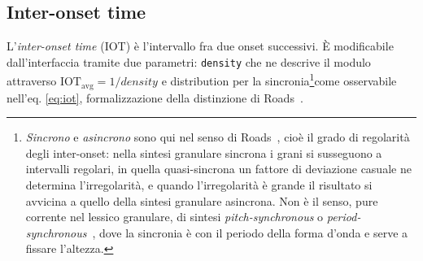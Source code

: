 \newcommand{\notaFillFactor}{\footnote{Il \emph{fill factor} di Roads è il prodotto della densità
per la durata del grano, $\mathrm{FF} =
\mathit{density}\cdot\texttt{grain.duration}$: a $\mathrm{FF}=1$ i grani sono
adiacenti (\emph{covered}), sotto 1 \emph{sparse}, sopra 1
\emph{packed}~\cite[pp.~105--106]{Roads2001}.}}

\newcommand{\notaSincrono}{\footnote{\emph{Sincrono} e
\emph{asincrono} sono qui nel senso di Roads~\cite[p.~93]{Roads2001}, cioè il
grado di regolarità degli inter-onset: nella sintesi granulare sincrona i grani
si susseguono a intervalli regolari, in quella quasi-sincrona un fattore di
deviazione casuale ne determina l'irregolarità, e quando l'irregolarità è grande
il risultato si avvicina a quello della sintesi granulare asincrona. Non è il
senso, pure corrente nel lessico granulare, di sintesi
\emph{pitch-synchronous} o
\emph{period-synchronous}~\cite{DePoliPiccialli1988}, dove la sincronia
è con il periodo della forma d'onda e serve a fissare l'altezza.}}

\newcommand{\notaEq}{\footnote{A \texttt{distribution} $=0$ ogni intervallo vale
$\mathrm{IOT}_{\mathrm{avg}}$: l'emissione è \emph{sincrona}, la griglia
metronomica. A \texttt{distribution} $=1$ l'intervallo è campionato da
una distribuzione uniforme su $[0,\,2\mathrm{IOT}_{\mathrm{avg}}]$:
l'emissione è \emph{asincrona}. Il parametro $d$ è il fattore di deviazione
casuale di Roads, e i valori intermedi $0<d<1$ sono il regime
\emph{quasi-sincrono}.}}
\subsection{Inter-onset time}\label{sec:griglia}
L'\emph{inter-onset time} (IOT) è l'intervallo fra due onset successivi.
È modificabile dall'interfaccia tramite due parametri: \texttt{density} che ne descrive il modulo attraverso
$\mathrm{IOT}_{\mathrm{avg}} = 1/\mathit{density}$ e distribution per la sincronia\notaSincrono come osservabile 
nell'eq. \ref{eq:iot}, formalizzazione della distinzione di Roads~\cite[p.~93]{Roads2001}.

